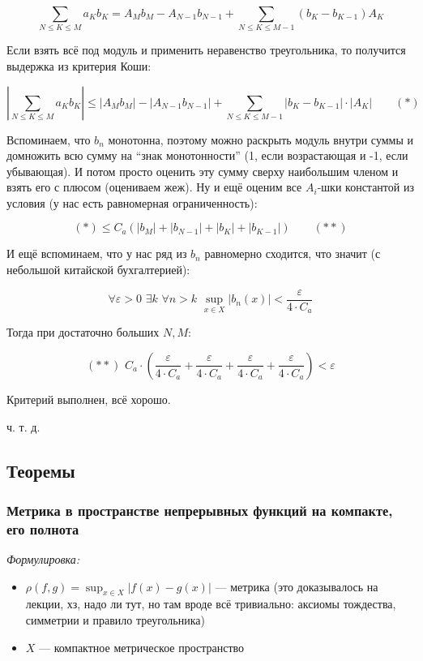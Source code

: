 \documentclass{article}
\def\dbl{\,\,}
\begin{document}
\[
    \sum_{N \le K \le M} {a_K b_K} = A_Mb_M - A_{N - 1}b_{N - 1} + \sum_{N \le K \le M - 1} {(b_K - b_{K - 1})A_K}
\]

Если взять всё под модуль и применить неравенство треугольника, то получится выдержка из критерия Коши: 

\[
    \left|\sum_{N \le K \le M} {a_K b_K}\right| \le |A_Mb_M| - |A_{N - 1}b_{N - 1}| + \sum_{N \le K \le M - 1} {\left|b_K - b_{K - 1}\right| \cdot \left|A_K\right|} \qquad (*)
\]

Вспоминаем, что $b_n$ монотонна, поэтому можно раскрыть модуль внутри суммы и домножить всю сумму на ``знак монотонности'' (1, если возрастающая и -1, если убывающая). И потом просто оценить эту сумму сверху наибольшим членом и взять его с плюсом (оцениваем жеж). Ну и ещё оценим все $A_i$-шки константой из условия (у нас есть равномерная ограниченность):

\[
    (*) \le C_a \left( |b_M| + |b_{N - 1}| + |b_{K}| + |b_{K - 1}|\right) \qquad (**)    
\]

И ещё вспоминаем, что у нас ряд из $b_n$ равномерно сходится, что значит (с небольшой китайской бухгалтерией): 

\[ \forall \varepsilon > 0 \dbl \exists k \dbl \forall n > k \dbl \sup_{x \in X} |b_n(x)| < \frac{\varepsilon}{4 \cdot C_a} \]

Тогда при достаточно больших $N, M$:

\[(**) \dbl C_a \cdot \left(\frac{\varepsilon}{4 \cdot C_a} + \frac{\varepsilon}{4 \cdot C_a} + \frac{\varepsilon}{4 \cdot C_a} + \frac{\varepsilon}{4 \cdot C_a} \right) < \varepsilon\]

Критерий выполнен, всё хорошо.

ч. т. д.

\newpage

\subsection{Теоремы}

\subsubsection{Метрика в пространстве непрерывных функций на компакте, его полнота}
\textit{Формулировка:}

\begin{itemize}
    \item $\rho(f, g) = \sup_{x \in X} |f(x) - g(x)|$ --- метрика (это доказывалось на лекции, хз, надо ли тут, но там вроде всё тривиально: аксиомы тождества, симметрии и правило треугольника) 
    \item $X$ --- компактное метрическое пространство
\end{itemize}
\end{document}

